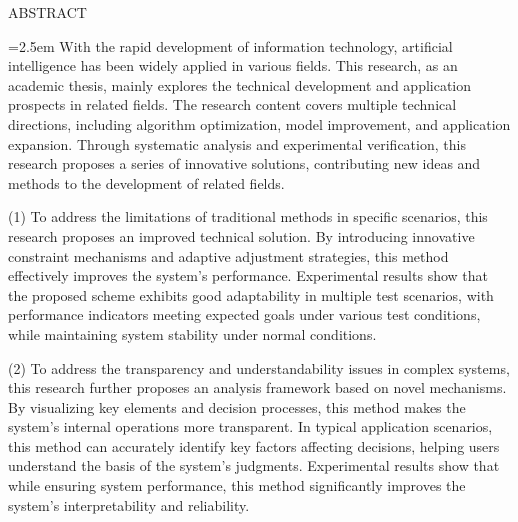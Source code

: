 {}
\vspace*{-\dimexpr\headheight+\headsep\relax}
{\centering\rmfamily{} ABSTRACT\par}
\vspace{0.5\baselineskip}
\begingroup
\setlength{\parindent}{2em}%
\justifying
{}\relax
{}\relax
\sloppy
\emergencystretch=2.5em\relax
\noindent\hspace{2em}With the rapid development of information technology, artificial intelligence has been widely applied in various fields. This research, as an academic thesis, mainly explores the technical development and application prospects in related fields. The research content covers multiple technical directions, including algorithm optimization, model improvement, and application expansion. Through systematic analysis and experimental verification, this research proposes a series of innovative solutions, contributing new ideas and methods to the development of related fields.

\noindent\hspace{2em}(1) To address the limitations of traditional methods in specific scenarios, this research proposes an improved technical solution. By introducing innovative constraint mechanisms and adaptive adjustment strategies, this method effectively improves the system's performance. Experimental results show that the proposed scheme exhibits good adaptability in multiple test scenarios, with performance indicators meeting expected goals under various test conditions, while maintaining system stability under normal conditions.

\noindent\hspace{2em}(2) To address the transparency and understandability issues in complex systems, this research further proposes an analysis framework based on novel mechanisms. By visualizing key elements and decision processes, this method makes the system's internal operations more transparent. In typical application scenarios, this method can accurately identify key factors affecting decisions, helping users understand the basis of the system's judgments. Experimental results show that while ensuring system performance, this method significantly improves the system's interpretability and reliability.

